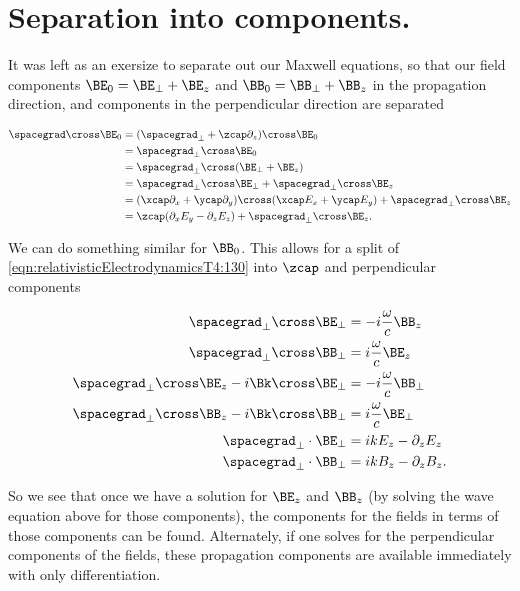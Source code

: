 \section{Separation into components.}

It was left as an exersize to separate out our Maxwell equations, so that our field components $\BE_0 = \BE_\perp + \BE_z$ and $\BB_0 = \BB_\perp + \BB_z$ in the propagation direction, and components in the perpendicular direction are separated

\begin{align*}
\spacegrad \cross \BE_0 
&=
(\spacegrad_\perp + \zcap\partial_z) \cross \BE_0 \\
&=
\spacegrad_\perp \cross \BE_0 \\
&=
\spacegrad_\perp \cross (\BE_\perp + \BE_z) \\
&=
\spacegrad_\perp \cross \BE_\perp 
+\spacegrad_\perp \cross \BE_z \\
&=
( \xcap \partial_x +\ycap \partial_y ) \cross ( \xcap E_x +\ycap E_y ) 
+\spacegrad_\perp \cross \BE_z \\
&=
\zcap (\partial_x E_y - \partial_z E_z) 
+\spacegrad_\perp \cross \BE_z.
\end{align*}

We can do something similar for $\BB_0$.  This allows for a split of \ref{eqn:relativisticElectrodynamicsT4:130} into $\zcap$ and perpendicular components

\begin{align}\label{eqn:relativisticElectrodynamicsT4:130b}
\spacegrad_\perp \cross \BE_\perp &= -i \frac{\omega}{c} \BB_z \\
\spacegrad_\perp \cross \BB_\perp &= i \frac{\omega}{c} \BE_z \\
\spacegrad_\perp \cross \BE_z - i \Bk \cross \BE_\perp &= -i \frac{\omega}{c} \BB_\perp \\
\spacegrad_\perp \cross \BB_z - i \Bk \cross \BB_\perp &= i \frac{\omega}{c} \BE_\perp \\
\spacegrad_\perp \cdot \BE_\perp &= i k E_z - \partial_z E_z \\
\spacegrad_\perp \cdot \BB_\perp &= i k B_z - \partial_z B_z.
\end{align}

So we see that once we have a solution for $\BE_z$ and $\BB_z$ (by solving the wave equation above for those components), the components for the fields in terms of those components can be found.  Alternately, if one solves for the perpendicular components of the fields, these propagation components are available immediately with only differentiation.

